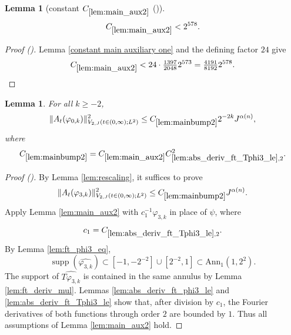 \documentclass[12pt,reqno]{amsart}
\newcommand{\auto}{{({\tiny\faCar})}}
\theoremstyle{plain}
\newtheorem{lemma}[theorem]{Lemma}
\numberwithin{equation}{section}
\theoremstyle{remark}
\newcommand{\uses}[1]{}
\newcommand{\usesdefs}[1]{}
\begin{document}
\begin{lemma}[constant $C_{\ref{lem:main_aux2}}$ \auto]\label{constant main auxiliary two}\uses{constant main auxiliary one,lem:main_aux2}\usesdefs{}
\begin{equation}\label{constant main auxiliary two bound}
C_{\ref{lem:main_aux2}}<2^{578}.
\end{equation}
\end{lemma}
\begin{proof}[Proof \auto]
Lemma \ref{constant main auxiliary one} and the defining factor $24$ give
\[
C_{\ref{lem:main_aux2}}
<24\cdot\tfrac{1397}{2048}2^{573}
=\tfrac{4191}{8192}2^{578}.
\]
\end{proof}

\begin{lemma}\label{lem:mainbump2}\uses{lem:rescaling,lem:main_aux2,lem:abs_deriv_ft_Tphi3_le,lem:ft_phi3_eq,lem:abs_deriv_ft_phi3_le,lem:ft_deriv_mul}\usesdefs{A_def,defn:window based bump functions}
For all $k\ge-2$,
\begin{equation}\label{mainbump2}
\|A_t(\varphi_{0,k})\|_{V_{2,J}(t\in(0,\infty);L^2)}^2
\le C_{\ref{lem:mainbump2}}2^{-2k}J^{\alpha(n)},
\end{equation}
where
\begin{equation}\label{auto:main-bump-two-constant-definition}
C_{\ref{lem:mainbump2}}
=C_{\ref{lem:main_aux2}}C_{\ref{lem:abs_deriv_ft_Tphi3_le},2}^2.
\end{equation}
\end{lemma}

\begin{proof}[Proof \auto]
By Lemma \ref{lem:rescaling}, it suffices to prove
\begin{equation}\label{mainbump2_1}
\|A_t(\varphi_{3,k})\|_{V_{2,J}(t\in(0,\infty);L^2)}^2
\le C_{\ref{lem:mainbump2}}J^{\alpha(n)}.
\end{equation}
Apply Lemma \ref{lem:main_aux2} with $c_1^{-1}\varphi_{3,k}$ in place of $\psi$, where
\[
c_1=C_{\ref{lem:abs_deriv_ft_Tphi3_le},2}.
\]
By Lemma \ref{lem:ft_phi3_eq},
\begin{equation}\label{mainbump2_supp}
\operatorname{supp}(\widehat{\varphi_{3,k}})
\subset[-1,-2^{-2}]\cup[2^{-2},1]
\subset\mathrm{Ann}_1(1,2^2).
\end{equation}
The support of $\widehat{T\varphi_{3,k}}$ is contained in the same annulus by Lemma \ref{lem:ft_deriv_mul}. Lemmas \ref{lem:abs_deriv_ft_phi3_le} and \ref{lem:abs_deriv_ft_Tphi3_le} show that, after division by $c_1$, the Fourier derivatives of both functions through order $2$ are bounded by $1$. Thus all assumptions of Lemma \ref{lem:main_aux2} hold.
\end{proof}
\end{document}
